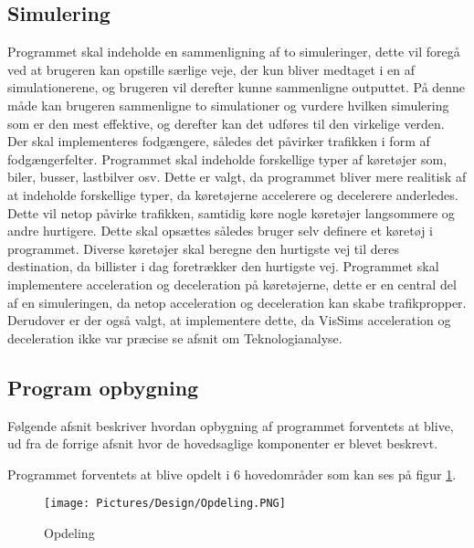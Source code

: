 \vspace{5mm}

\subsection{Simulering}
Programmet skal indeholde en sammenligning af to simuleringer, dette vil foregå ved at brugeren kan opstille særlige veje, der kun bliver medtaget i en af simulationerene, og brugeren vil derefter kunne sammenligne outputtet. På denne måde kan brugeren sammenligne to simulationer og vurdere hvilken simulering som er den mest effektive, og derefter kan det udføres til den virkelige verden. Der skal implementeres fodgængere, således det påvirker trafikken i form af fodgængerfelter. Programmet skal indeholde forskellige typer af køretøjer som, biler, busser, lastbilver osv. Dette er valgt, da programmet bliver mere realitisk af at indeholde forskellige typer, da køretøjerne accelerere og decelerere anderledes. Dette vil netop påvirke trafikken, samtidig køre nogle køretøjer langsommere og andre hurtigere. Dette skal opsættes således bruger selv definere et køretøj i programmet.  Diverse køretøjer skal beregne den hurtigste vej til deres destination, da billister i dag foretrækker den hurtigste vej. Programmet skal implementere acceleration og deceleration på køretøjerne, dette er en central del af en simuleringen, da netop acceleration og deceleration kan skabe trafikpropper. Derudover er der også valgt, at implementere dette, da VisSims acceleration og deceleration ikke var præcise se afsnit om Teknologianalyse. 

\vspace{5mm}

\subsection{Program opbygning}\label{ProgramOpbygning}
Følgende afsnit beskriver hvordan opbygning af programmet forventets at blive, ud fra de forrige afsnit hvor de hovedsaglige komponenter er blevet beskrevt.

Programmet forventets at blive opdelt i 6 hovedområder som kan ses på figur \ref{fig:ProgramOpdeling}. 

\begin{figure}[H]
\begin{adjustbox}{width=0.4\textwidth,center=\textwidth}
\centering
\texttt{[image: Pictures/Design/Opdeling.PNG]}
\end{adjustbox}
\caption{Opdeling}
\label{fig:ProgramOpdeling}
\end{figure}

